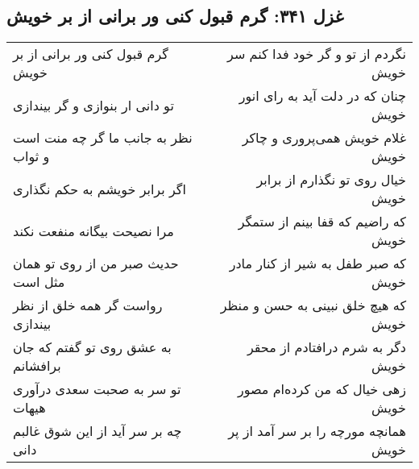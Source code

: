 \begin{center}
\section*{غزل ۳۴۱: گرم قبول کنی ور برانی از بر خویش}
\label{sec:341}
\begin{longtable}{l p{0.5cm} r}
گرم قبول کنی ور برانی از بر خویش
&&
نگردم از تو و گر خود فدا کنم سر خویش
\\
تو دانی ار بنوازی و گر بیندازی
&&
چنان که در دلت آید به رای انور خویش
\\
نظر به جانب ما گر چه منت است و ثواب
&&
غلام خویش همی‌پروری و چاکر خویش
\\
اگر برابر خویشم به حکم نگذاری
&&
خیال روی تو نگذارم از برابر خویش
\\
مرا نصیحت بیگانه منفعت نکند
&&
که راضیم که قفا بینم از ستمگر خویش
\\
حدیث صبر من از روی تو همان مثل است
&&
که صبر طفل به شیر از کنار مادر خویش
\\
رواست گر همه خلق از نظر بیندازی
&&
که هیچ خلق نبینی به حسن و منظر خویش
\\
به عشق روی تو گفتم که جان برافشانم
&&
دگر به شرم درافتادم از محقر خویش
\\
تو سر به صحبت سعدی درآوری هیهات
&&
زهی خیال که من کرده‌ام مصور خویش
\\
چه بر سر آید از این شوق غالبم دانی
&&
همانچه مورچه را بر سر آمد از پر خویش
\\
\end{longtable}
\end{center}
